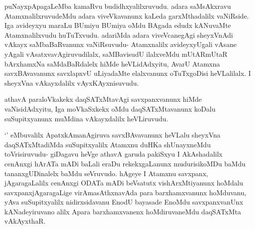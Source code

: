 \begin{artha}
puNayxpApagaLeMba kamaRvu budidhxyalilxruvudu. adara saMsAkxravu AtamxnalilxruvudeMdu adara viveVkavanunx kaLeda garxMthadalilx vaNiRside. Iga avideyxyu maraLu BUmiyu BUmiya oMdu BAgada edudx kANuvaMte Atamxnalilxvudu huTuTxvudu. adariMda adara viveVcanegAgi sheyxVnAdi vAkayx saMbaBaRvanunx vaNiRsuvudu- Atamxnalilx avideyxyUgali vAsane yAgali vAsatxvavAgiruvudilalx, saMBavisudU ilalxveMdu mUtARmUtaR bArxhamxNa saMdaBaRdalelx hiMde heVLidAdxyitu, AvarU Atamxna savxBAvavanunx savxlapxvU uLiyadaMte elalxvanunx oTuTxgoDisi heVLalilalx. I sheyxVna vAkayxdalilx vAyxKAyxnisuvudu. 
\end{artha}

\begin{artha}
athavA paraloVkakekx daqSATxMtavAgi savxpanxvanunx hiMde vaNisidAdxyitu,
Iga moVkaSxkekx oMdu daqSATxMtavanunx koDalu suSupitxyanunx muMdina vAkayxdalilx heVLiruvudu.
\end{artha}


\begin{artha}
`\stext ' eMbuvalilx ApatxkAmanAgiruva savxBAvavanunx heVLalu sheyxVna daqSATxMtadiMda suSupitxyalilx Atamxnu duHKa shUnayxneMdu toVrisiruvudu- giDagavu heVge athavA garuda pakiSxyu I AkAshadalilx cenAnxgi hArATa mADi baLali eraDu rekekxgaLanunx mudurisikoMDu baMdu tananxgUDinalelx baMdu seVruvudo. hAgeye I Atamxnu savxpanx, jAgaragaLalilx cenAnxgi ODATa mADi beVsatutx vishArxMtiyanunx hoMdalu savxpanxjAgaragaLige virAmasAthxnavAda para barxhamxvanunx hoMduvanu, yAva suSupitxyalilx nidirxsidavanu EnodU bayasade EnoMdu savxpanxvanUnx kANadeyiruvano alilx Apara barxhamxvanenx hoMdiruvaneMdu daqSATxMta vAkAyxthaR. 
\end{artha}%


